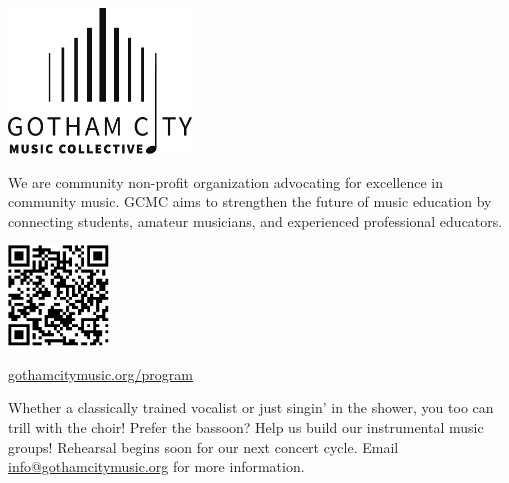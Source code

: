 \documentclass{article}[10pt]
\newcommand{\logo}{
    {\includegraphics[width=0.365\textwidth]{../../graphic_design_assets/bw_logo_full}}
}
\newcommand{\tunedspace}{\vspace{0.2in}}
\begin{document}
\begin{center}
\pagebreak


{\logo}

\tunedspace

\begin{minipage}{4in}

    
\begin{small}
We are community non-profit organization advocating for excellence in community music.
GCMC aims to strengthen the future of music education by connecting students, amateur musicians, and experienced professional educators.
\end{small}

\begin{center}
    {\textbf{}}

    \vspace{0.1in}

    {\includegraphics[width=0.2\textwidth]{../../graphic_design_assets/gotham_city_music_collective_program}}

    \href{https://gothamcitymusic.org/program}{gothamcitymusic.org/program}
\end{center}

\begin{center}
{\textbf{}}
\end{center}

\vspace{-0.1in}

\begin{small}
Whether a classically trained vocalist or just singin' in the shower,
you too can trill with the choir!
Prefer the bassoon?
Help us build our instrumental music groups!
Rehearsal begins soon for our next concert cycle.
Email \href{info@gothamcitymusic.org}{info@gothamcitymusic.org} for more information.
\end{small}

\begin{center}
{\textbf{}}
\end{center}

\vspace{-0.1in}


\end{minipage}
\end{center}
\end{document}
